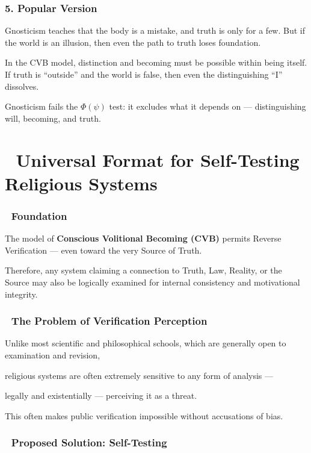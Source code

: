 \documentclass[12pt]{article}
\begin{document}
\subsubsection*{5. Popular Version}

Gnosticism teaches that the body is a mistake, and truth is only for a few. But if the world is an illusion, then even the path to truth loses foundation.

In the CVB model, distinction and becoming must be possible within being itself. If truth is ``outside'' and the world is false, then even the distinguishing ``I'' dissolves.

Gnosticism fails the $\Phi(\psi)$ test: it excludes what it depends on — distinguishing will, becoming, and truth.

\section*{🔷 Universal Format for Self-Testing Religious Systems}

\subsubsection*{🔹 Foundation}

The model of \textbf{Conscious Volitional Becoming (CVB)} permits \text{[25]} Reverse Verification — even toward the very Source of Truth.

Therefore, any system claiming a connection to Truth, Law, Reality, or the Source may also be logically examined for internal consistency and motivational integrity.

\subsubsection*{🔹 The Problem of Verification Perception}

Unlike most scientific and philosophical schools, which are generally open to examination and revision,

religious systems are often extremely sensitive to any form of analysis —

legally and existentially — perceiving it as a threat.

This often makes public verification impossible without accusations of bias.

\subsubsection*{🔹 Proposed Solution: Self-Testing}
\end{document}
